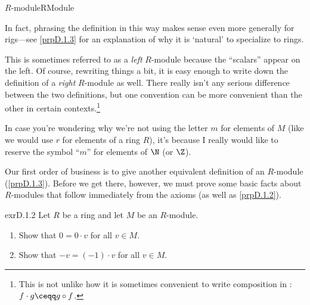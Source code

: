 \begin{dfn}{$R$-module}{RModule}
\begin{rmk}
In fact, phrasing the definition in this way makes sense even more generally for rigs---see \cref{prpD.1.3} for an explanation of why it is `natural' to specialize to rings.
\end{rmk}
\begin{rmk}
This is sometimes referred to as a \emph{left} $R$-module because the ``scalars'' appear on the left.  Of course, rewriting things a bit, it is easy enough to write down the definition of a \emph{right} $R$-module as well.  There really isn't any serious difference between the two definitions, but one convention can be more convenient than the other in certain contexts.\footnote{This is not unlike how it is sometimes convenient to write composition in :  $f\cdot g\ceqq g\circ f$.}
\end{rmk}
\begin{rmk}
In case you're wondering why we're not using the letter $m$ for elements of $M$ (like we would use $r$ for elements of a ring $R$), it's because I really would like to reserve the symbol ``$m$'' for elements of $\N$ (or $\Z$).
\end{rmk}
\end{dfn}
Our first order of business is to give another equivalent definition of an $R$-module (\cref{prpD.1.3}).  Before we get there, however, we must prove some basic facts about $R$-modules that follow immediately from the axioms (as well as \cref{prpD.1.2}).
\begin{exr}{}{exrD.1.2}
Let $R$ be a ring and let $M$ be an $R$-module.
\begin{enumerate}
\item Show that $0=0\cdot v$ for all $v\in M$.
\item Show that $-v=(-1)\cdot v$ for all $v\in M$.
\end{enumerate}
\end{exr}

